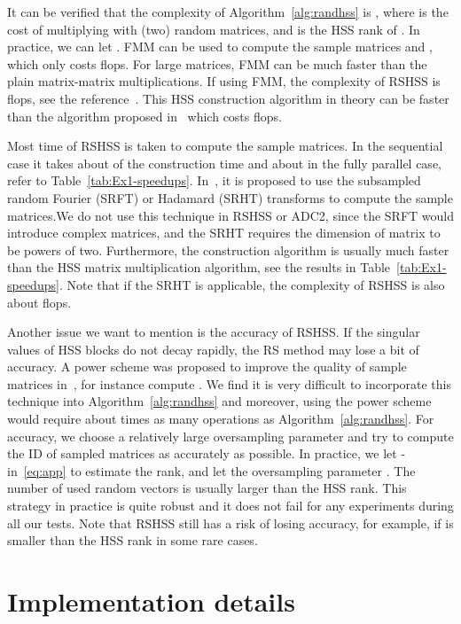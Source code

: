 \documentclass[times]{nlaauth}
\newcounter{algorithm}
\begin{document}
It can be verified that the complexity of Algorithm~\ref{alg:randhss} is , where
 is the cost of multiplying  with (two) random matrices, and  is the HSS rank of .
In practice, we can let .
FMM can be used to compute the sample matrices  and , which only costs  flops.
For large matrices, FMM can be much faster than the plain matrix-matrix multiplications.
If using FMM, the complexity of RSHSS is  flops,
see the reference~\cite{rand-hss}.
This HSS construction algorithm in theory can be faster than the algorithm proposed in~\cite{Shengguo-SIMAX2} which costs  flops.


Most time of RSHSS is taken to compute the sample matrices.
In the sequential case it takes about  of the construction time and
about  in the fully parallel case, refer to Table~\ref{tab:Ex1-speedups}.
In~\cite{Martinsson-Rev10}, it is proposed to use the subsampled random Fourier (SRFT) or Hadamard (SRHT) transforms to compute
the sample matrices.We do not use this technique in RSHSS or ADC2, since the SRFT would introduce complex matrices, and
the SRHT requires the dimension of matrix  to be powers of two.
Furthermore, the construction algorithm is usually much faster than the HSS matrix multiplication algorithm, see the
results in Table~\ref{tab:Ex1-speedups}.
Note that if the SRHT is applicable, the complexity of RSHSS is also about  flops.

Another issue we want to mention is the accuracy of RSHSS.
If the singular values of HSS blocks do not decay rapidly, the RS
method may lose a bit of accuracy. A power scheme was proposed to improve the quality of sample matrices in~\cite{Martinsson-Rev10},
for instance compute .
We find it is very difficult to incorporate this technique into
Algorithm~\ref{alg:randhss} and moreover, using the power scheme would require about  times as many
operations as Algorithm~\ref{alg:randhss}.
For accuracy, we choose a relatively large oversampling parameter  and try to compute the ID of sampled matrices
as accurately as possible.
In practice, we let - in~\eqref{eq:app} to estimate the rank, and let the oversampling
parameter .
The number of used random vectors is usually larger than the
HSS rank.
This strategy in practice is quite robust and it does not fail for any experiments during all our tests.
Note that RSHSS still has a risk of losing accuracy, for example, if  is smaller than the HSS rank in some rare cases.

\section{Implementation details}
\label{sec:impl}
\end{document}
